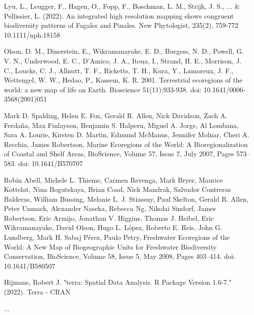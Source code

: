 \documentclass[a4paper]{book}
\begin{document}
\begin{References}\relax
Lyu, L., Leugger, F., Hagen, O., Fopp, F., Boschman, L. M., Strijk, J. S., ... \&
Pellissier, L. (2022). An integrated high resolution mapping shows congruent biodiversity
patterns of Fagales and Pinales. New Phytologist, 235(2), 759-772 10.1111/nph.18158

Olson, D. M., Dinerstein, E., Wikramanayake, E. D., Burgess, N. D., Powell, G. V. N.,
Underwood, E. C., D'Amico, J. A., Itoua, I., Strand, H. E., Morrison, J. C., Loucks, C. J.,
Allnutt, T. F., Ricketts, T. H., Kura, Y., Lamoreux, J. F., Wettengel, W. W., Hedao, P., Kassem,
K. R. 2001. Terrestrial ecoregions of the world: a new map of life on Earth.
Bioscience 51(11):933-938. doi: 10.1641/0006-3568(2001)051

Mark D. Spalding, Helen E. Fox, Gerald R. Allen, Nick Davidson, Zach A. Ferdaña, Max
Finlayson, Benjamin S. Halpern, Miguel A. Jorge, Al Lombana, Sara A. Lourie, Kirsten D.
Martin, Edmund McManus, Jennifer Molnar, Cheri A. Recchia, James Robertson, Marine
Ecoregions of the World: A Bioregionalization of Coastal and Shelf Areas, BioScience,
Volume 57, Issue 7, July 2007, Pages 573–583. doi: 10.1641/B570707

Robin Abell, Michele L. Thieme, Carmen Revenga, Mark Bryer, Maurice Kottelat, Nina Bogutskaya,
Brian Coad, Nick Mandrak, Salvador Contreras Balderas, William Bussing, Melanie L. J. Stiassny,
Paul Skelton, Gerald R. Allen, Peter Unmack, Alexander Naseka, Rebecca Ng, Nikolai Sindorf,
James Robertson, Eric Armijo, Jonathan V. Higgins, Thomas J. Heibel, Eric Wikramanayake,
David Olson, Hugo L. López, Roberto E. Reis, John G. Lundberg, Mark H. Sabaj Pérez,
Paulo Petry, Freshwater Ecoregions of the World: A New Map of Biogeographic Units for
Freshwater Biodiversity Conservation, BioScience, Volume 58, Issue 5, May 2008,
Pages 403–414. doi: 10.1641/B580507

Hijmans, Robert J. "terra: Spatial Data Analysis. R Package Version 1.6-7." (2022). Terra - CRAN
\end{References}
%
\begin{SeeAlso}\relax
...
\end{SeeAlso}
%
\begin{Examples}
\end{Examples}
\end{document}
